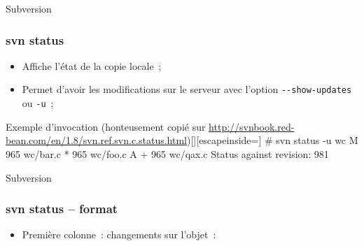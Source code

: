\begin{frame}[fragile]{Subversion}
\frametitle{svn status}
\begin{itemize}[<+->]
 \item Affiche l'état de la copie locale~;
 \item Permet d'avoir les modifications sur le serveur avec l'option \verb/--show-updates/ ou \verb/-u/~;
\end{itemize}
\begin{snvlisting}{Exemple d'invocation (honteusement copié sur \url{http://svnbook.red-bean.com/en/1.8/svn.ref.svn.c.status.html})}[][escapeinside={}]
# svn status -u wc
 M            965    wc/bar.c
        *     965    wc/foo.c
A  +          965    wc/qax.c
Status against revision:    981
\end{snvlisting}
\end{frame}

\begin{frame}[fragile]{Subversion}
\frametitle{svn status -- format}
\begin{itemize}[<+->]
 \item Première colonne~: changements sur l'objet~:
\end{itemize}
\end{frame}

